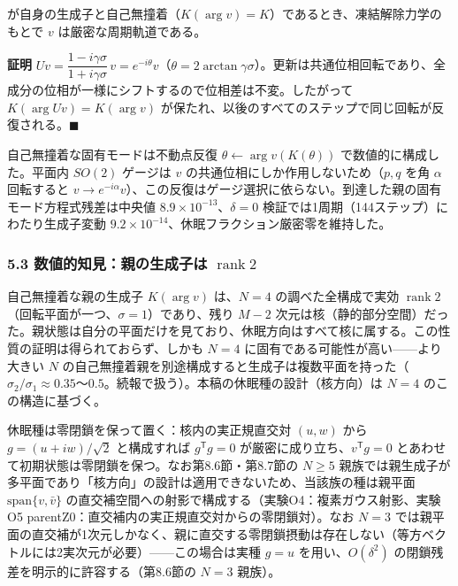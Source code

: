 \documentclass[
  a4paper,
]{ltjsarticle}
\begin{document}
が自身の生成子と自己無撞着（\(K(\arg v)=K\)）であるとき、凍結解除力学のもとで
\(v\) は厳密な周期軌道である。

\textbf{証明}
\(Uv=\dfrac{1-i\gamma\sigma}{1+i\gamma\sigma}\,v=e^{-i\theta}v\)（\(\theta=2\arctan\gamma\sigma\)）。更新は共通位相回転であり、全成分の位相が一様にシフトするので位相差は不変。したがって
\(K(\arg Uv)=K(\arg v)\)
が保たれ、以後のすべてのステップで同じ回転が反復される。\(\blacksquare\)

自己無撞着な固有モードは不動点反復 \(\theta\leftarrow\arg v(K(\theta))\)
で数値的に構成した。平面内 \(SO(2)\) ゲージは \(v\)
の共通位相にしか作用しないため（\(p,q\) を角 \(\alpha\) 回転すると
\(v\to e^{-i\alpha}v\)）、この反復はゲージ選択に依らない。到達した親の固有モード方程式残差は中央値
\(8.9\times10^{-13}\)、\(\delta=0\)
検証では1周期（144ステップ）にわたり生成子変動
\(9.2\times10^{-14}\)、休眠フラクション厳密零を維持した。

\subsubsection{\texorpdfstring{5.3 数値的知見：親の生成子は
\(\operatorname{rank}2\)}{5.3 数値的知見：親の生成子は \textbackslash operatorname\{rank\}2}}\label{ux6570ux5024ux7684ux77e5ux898bux89aaux306eux751fux6210ux5b50ux306f-operatornamerank2}

自己無撞着な親の生成子 \(K(\arg v)\) は、\(N=4\) の調べた全構成で実効
\(\operatorname{rank}2\)（回転平面が一つ、\(\sigma=1\)）であり、残り
\(M-2\)
次元は核（静的部分空間）だった。親状態は自分の平面だけを見ており、休眠方向はすべて核に属する。この性質の証明は得られておらず、しかも
\(N=4\) に固有である可能性が高い------より大きい \(N\)
の自己無撞着親を別途構成すると生成子は複数平面を持った（\(\sigma_2/\sigma_1\approx0.35\)〜\(0.5\)。続報で扱う）。本稿の休眠種の設計（核方向）は
\(N=4\) のこの構造に基づく。

休眠種は零閉鎖を保って置く：核内の実正規直交対 \((u,w)\) から
\(g=(u+iw)/\sqrt2\) と構成すれば \(g^{\mathsf T}g=0\)
が厳密に成り立ち、\(v^{\mathsf T}g=0\)
とあわせて初期状態は零閉鎖を保つ。なお第8.6節・第8.7節の \(N\ge5\)
親族では親生成子が多平面であり「核方向」の設計は適用できないため、当該族の種は親平面
\(\mathrm{span}\{v,\bar v\}\)
の直交補空間への射影で構成する（実験O4：複素ガウス射影、実験O5
parentZ0：直交補内の実正規直交対からの零閉鎖対）。なお \(N=3\)
では親平面の直交補が1次元しかなく、親に直交する零閉鎖摂動は存在しない（等方ベクトルには2実次元が必要）------この場合は実種
\(g=u\) を用い、\(O(\delta^2)\) の閉鎖残差を明示的に許容する（第8.6節の
\(N=3\) 親族）。
\end{document}
